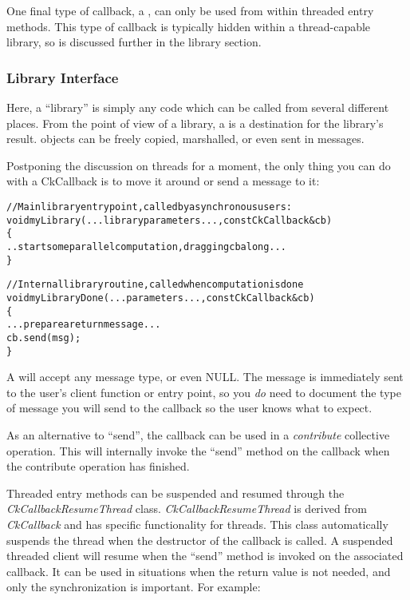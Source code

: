 One final type of callback, a , 
can only be used from within threaded entry methods.  This type of callback
is typically hidden within a thread-capable library, so is discussed further
in the library section.


\subsubsection{Library Interface}

\label{libraryInterface}

Here, a ``library'' is simply any \charmpp{} code which can be called from several
different places.  From the point of view of a library, a 
is a destination for the library's result.   objects can
be freely copied, marshalled, or even sent in messages.

Postponing the discussion on threads for a moment, the only thing you can do 
with a CkCallback is to move it around or send a message to it:

\begin{alltt}
//Main library entry point, called by asynchronous users:
void myLibrary(...library parameters...,const CkCallback \&cb) 
\{
  ..start some parallel computation, dragging cb along...
\}

//Internal library routine, called when computation is done
void myLibraryDone(...parameters...,const CkCallback \&cb)
\{
  ...prepare a return message...
  cb.send(msg);
\}
\end{alltt}

A  will accept any message type, or even NULL.  The
message is immediately sent to the user's client function or entry point,
so you {\em do} need to document the type of message you will send to the 
callback so the user knows what to expect.

As an alternative to ``send'', the callback can be used in a {\em contribute}
collective operation. This will internally invoke the ``send'' method on the
callback when the contribute operation has finished.

Threaded entry methods can be suspended and resumed through the 
{\em CkCallbackResumeThread} class. {\em CkCallbackResumeThread}
is derived from {\em CkCallback} and has specific functionality for threads.
This class automatically suspends the thread when the destructor of the callback is called. 
A suspended threaded client will resume when the ``send'' method is
invoked on the associated callback.
It can be used in situations when the return value is not needed, and only the
synchronization is important. For example:

